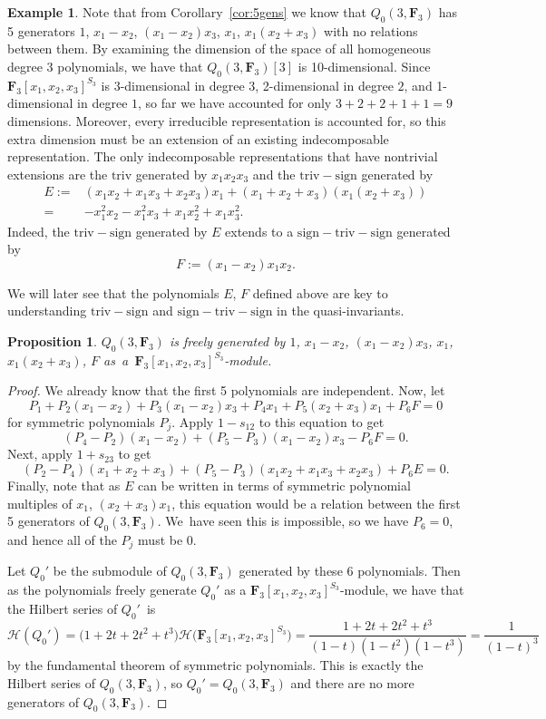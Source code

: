 \documentclass[11pt]{article}
\numberwithin{equation}{section}
\newtheorem{Proposition}[Theorem]{Proposition}
\theoremstyle{definition}
\newtheorem{Example}[Theorem]{Example}
\numberwithin{equation}{section}
\newcommand{\F}{\mathbf{F}}
\newcommand{\triv}{\mathrm{triv}}
\newcommand{\six}{\mathrm{sign-triv-sign}}
\newcommand{\tign}{\mathrm{triv-sign}}
\begin{document}
 \begin{Example}%
 Note that from Corollary~\ref{cor:5gens} we know that $Q_0(3,\mathbf{F}_3)$ has 5 generators $1$, $x_1-x_2$, $(x_1-x_2)x_3$, $x_1$, $x_1(x_2+x_3)$ with no relations between them. By examining the dimension of the space of all homogeneous degree 3 polynomials, we have that $Q_0(3,\mathbf{F}_3)[3]$ is 10-dimensional. Since $\mathbf{F}_3[x_1,x_2,x_3]^{S_3}$ is 3-dimensional in degree $3$, 2-dimensional in degree $2$, and 1-dimensional in degree $1$, so far we have accounted for only $3+2+2+1+1=9$ dimensions. Moreover, every irreducible representation is accounted for, so this extra dimension must be an extension of an existing indecomposable representation. The only indecomposable representations that have nontrivial extensions are the $\triv$ generated by $x_1x_2x_3$ and the $\tign$ generated by
 \begin{align*}
 E :={}& (x_1x_2+x_1x_3+x_2x_3)x_1+(x_1+x_2+x_3)(x_1(x_2+x_3))\\
 ={}& {-}x_1^2x_2-x_1^2x_3+x_1x_2^2+x_1x_3^2.
 \end{align*}
 Indeed, the $\tign$ generated by $E$ extends to a $\six$ generated by
 \[F:=(x_1-x_2)x_1x_2.\]
 \end{Example}

 We will later see that the polynomials $E$, $F$ defined above are key to understanding $\tign$ and $\six$ in the quasi-invariants.

 \begin{Proposition}\label{prop:q0}
 $Q_0(3,\mathbf{F}_3)$ is freely generated by $1$, $x_1-x_2$, $(x_1-x_2)x_3$, $x_1$, $x_1(x_2+x_3)$, $F$ as~a~$\mathbf{F}_3[x_1,x_2,x_3]^{S_3}$-module.
 \end{Proposition}
 \begin{proof}
 We already know that the first 5 polynomials are independent. Now, let
 \[P_1+P_2(x_1-x_2)+P_3(x_1-x_2)x_3+P_4x_1+P_5(x_2+x_3)x_1+P_6F=0\]
 for symmetric polynomials $P_j$. Apply $1-s_{12}$ to this equation to get
 \[(P_4-P_2)(x_1-x_2)+(P_5-P_3)(x_1-x_2)x_3-P_6F=0.\]
 Next, apply $1+s_{23}$ to get
 \[(P_2-P_4)(x_1+x_2+x_3)+(P_5-P_3)(x_1x_2+x_1x_3+x_2x_3)+P_6E=0.\]
 Finally, note that as $E$ can be written in terms of symmetric polynomial multiples of $x_1$, ${(x_2+x_3)x_1}$, this equation would be a relation between the first 5 generators of $Q_0(3,\mathbf{F}_3)$. We~have seen this is impossible, so we have $P_6=0$, and hence all of the $P_j$ must be 0.

 Let $Q_0'$ be the submodule of $Q_0(3,\mathbf{F}_3)$ generated by these 6 polynomials. Then as the polynomials freely generate $Q_0'$ as a $\F_3[x_1,x_2,x_3]^{S_3}$-module, we have that the Hilbert series of $Q_0'$~is
 \[\mathcal{H}(Q_0')=\big(1+2t+2t^2+t^3\big)\mathcal{H}\big(\F_3[x_1,x_2,x_3]^{S_3}\big)=\frac{1+2t+2t^2+t^3}{(1-t)(1-t^2)(1-t^3)}=\frac{1}{(1-t)^3}\]
 by the fundamental theorem of symmetric polynomials. This is exactly the Hilbert series of $Q_0(3,\mathbf{F}_3)$, so $Q_0'=Q_0(3,\mathbf{F}_3)$ and there are no more generators of $Q_0(3,\mathbf{F}_3)$.
 \end{proof}
\end{document}
